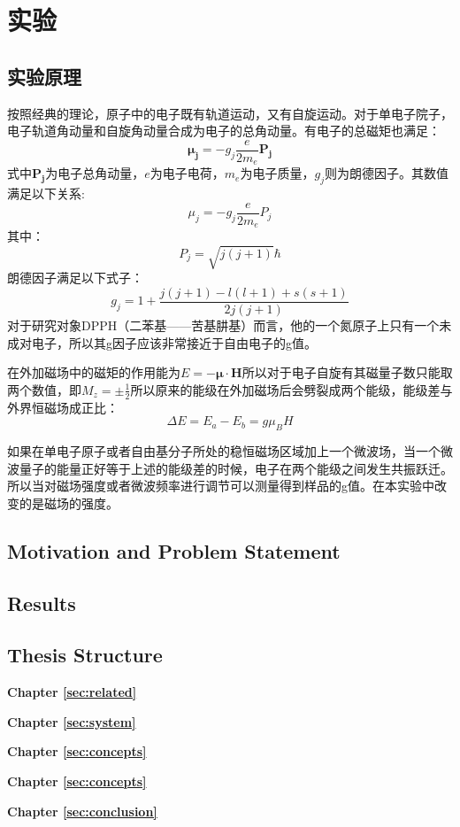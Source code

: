 %
\chapter{实验}
\label{sec:Experiment}

\section{实验原理}
\label{sec:Experiment:Theory}

按照经典的理论，原子中的电子既有轨道运动，又有自旋运动。对于单电子院子，电子轨道角动量和自旋角动量合成为电子的总角动量。有电子的总磁矩也满足：
\begin{equation}
	\bm{\mu_j}=-g_j\frac{e}{2m_e}\bm{P_j}
\end{equation}
式中$\bm{P_j}$为电子总角动量，$e$为电子电荷，$m_e$为电子质量，$g_j$则为朗德因子。其数值满足以下关系:
\begin{equation}
	\mu_j=-g_j\frac{e}{2m_e}P_j	
\end{equation}
其中：
$$P_j=\sqrt{j(j+1)}\hbar$$
朗德因子满足以下式子：
$$g_j=1+\frac{j(j+1)-l(l+1)+s(s+1)}{2j(j+1)}$$
对于研究对象DPPH（二苯基——苦基肼基）而言，他的一个氮原子上只有一个未成对电子，所以其g因子应该非常接近于自由电子的g值。

在外加磁场中的磁矩的作用能为$E=-\bm{\mu}\cdot\bm{H}$所以对于电子自旋有其磁量子数只能取两个数值，即$M_z=\pm\frac{1}{2}$所以原来的能级在外加磁场后会劈裂成两个能级，能级差与外界恒磁场成正比：
\begin{equation}
	\Delta E=E_a-E_b=g\mu_B H
\end{equation}

如果在单电子原子或者自由基分子所处的稳恒磁场区域加上一个微波场，当一个微波量子的能量正好等于上述的能级差的时候，电子在两个能级之间发生共振跃迁。所以当对磁场强度或者微波频率进行调节可以测量得到样品的g值。在本实验中改变的是磁场的强度。
\section{Motivation and Problem Statement}
\label{sec:intro:motivation}

\Blindtext[3][1]

\section{Results}
\label{sec:intro:results}

\Blindtext[1][2]

\section{Thesis Structure}
\label{sec:intro:structure}

\textbf{Chapter \ref{sec:related}} \\[0.2em]
\blindtext

\textbf{Chapter \ref{sec:system}} \\[0.2em]
\blindtext

\textbf{Chapter \ref{sec:concepts}} \\[0.2em]
\blindtext

\textbf{Chapter \ref{sec:concepts}} \\[0.2em]
\blindtext

\textbf{Chapter \ref{sec:conclusion}} \\[0.2em]
\blindtext
